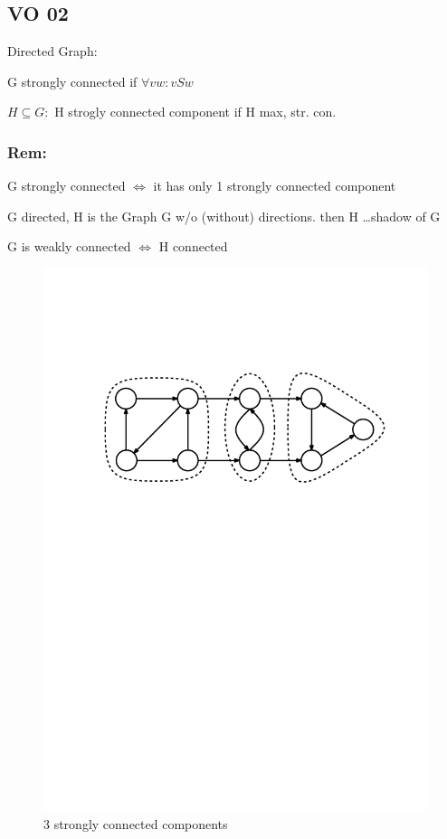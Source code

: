 \subsection*{VO 02}

Directed Graph:

G strongly connected if $\forall vw : vSw$

$H \subseteq G: $ H strogly connected component if H max, str. con.

\subsubsection*{Rem:}
G strongly connected $\iff$ it has only 1 strongly connected component

G directed, H is the Graph G w/o (without) directions. then 
H \ldots shadow of G

G is weakly connected $\iff$ H connected

\begin{figure}[htb]
	\centering
	\includegraphics[scale=.5]{01_graph_theory/pics/strongly-connected_component.pdf}
	\caption{3 strongly connected components}
\end{figure}
\FloatBarrier

